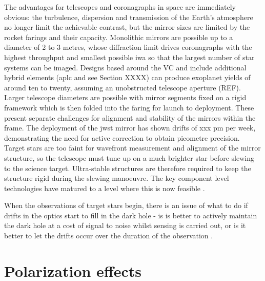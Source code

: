 \documentclass[letterpaper]{ar-1col}
\begin{document}
The advantages for telescopes and coronagraphs in space are immediately obvious: the turbulence, dispersion and transmission of the Earth's atmosphere no longer limit the achievable contrast, but the mirror sizes are limited by the rocket farings and their capacity.
%
Monolithic mirrors are possible up to a diameter of 2 to 3 metres, whose diffraction limit drives coronagraphs with the highest throughput and smallest possible \ac{iwa} so that the largest number of star systems can be imaged.
%
Designs based around the VC and include additional hybrid elements (\ac{aplc} and see Section XXXX) can produce exoplanet yields of around ten to twenty, assuming an unobstructed telescope aperture (REF).
%
Larger telescope diameters are possible with mirror segments fixed on a rigid framework which is then folded into the faring for launch to deployment.
%
These present separate challenges for alignment and stability of the mirrors within the frame.
%
The deployment of the \ac{jwst} mirror has shown drifts of xxx pm per week, demonstrating the need for active correction to obtain picometre precision.
%
Target stars are too faint for wavefront measurement and alignment of the mirror structure, so the telescope must tune up on a much brighter star before slewing to the science target.
%
Ultra-stable structures are therefore required to keep the structure rigid during the slewing manoeuvre.
%
The key component level technologies have matured to a level where this is now feasible \citep{Coyle21}.

When the observations of target stars begin, there is an issue of what to do if drifts in the optics start to fill in the dark hole - is is better to actively maintain the dark hole at a cost of signal to noise whilst sensing is carried out, or is it better to let the drifts occur over the duration of the observation \citep{Pogorelyuk19,Redmond20}.









\section{Polarization effects} 
\end{document}
